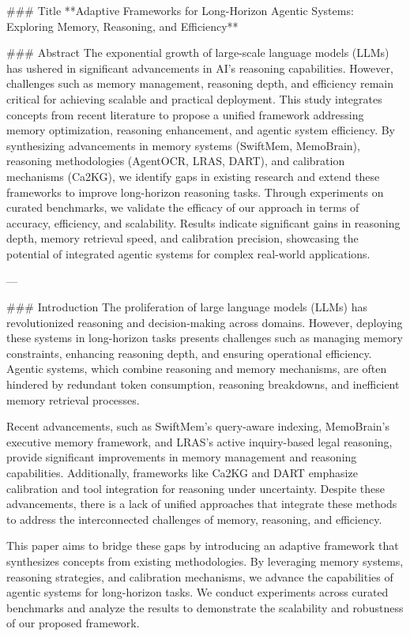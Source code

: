 ### Title
**Adaptive Frameworks for Long-Horizon Agentic Systems: Exploring Memory, Reasoning, and Efficiency**

### Abstract
The exponential growth of large-scale language models (LLMs) has ushered in significant advancements in AI's reasoning capabilities. However, challenges such as memory management, reasoning depth, and efficiency remain critical for achieving scalable and practical deployment. This study integrates concepts from recent literature to propose a unified framework addressing memory optimization, reasoning enhancement, and agentic system efficiency. By synthesizing advancements in memory systems (SwiftMem, MemoBrain), reasoning methodologies (AgentOCR, LRAS, DART), and calibration mechanisms (Ca2KG), we identify gaps in existing research and extend these frameworks to improve long-horizon reasoning tasks. Through experiments on curated benchmarks, we validate the efficacy of our approach in terms of accuracy, efficiency, and scalability. Results indicate significant gains in reasoning depth, memory retrieval speed, and calibration precision, showcasing the potential of integrated agentic systems for complex real-world applications.

---

### Introduction
The proliferation of large language models (LLMs) has revolutionized reasoning and decision-making across domains. However, deploying these systems in long-horizon tasks presents challenges such as managing memory constraints, enhancing reasoning depth, and ensuring operational efficiency. Agentic systems, which combine reasoning and memory mechanisms, are often hindered by redundant token consumption, reasoning breakdowns, and inefficient memory retrieval processes.

Recent advancements, such as SwiftMem's query-aware indexing, MemoBrain's executive memory framework, and LRAS's active inquiry-based legal reasoning, provide significant improvements in memory management and reasoning capabilities. Additionally, frameworks like Ca2KG and DART emphasize calibration and tool integration for reasoning under uncertainty. Despite these advancements, there is a lack of unified approaches that integrate these methods to address the interconnected challenges of memory, reasoning, and efficiency.

This paper aims to bridge these gaps by introducing an adaptive framework that synthesizes concepts from existing methodologies. By leveraging memory systems, reasoning strategies, and calibration mechanisms, we advance the capabilities of agentic systems for long-horizon tasks. We conduct experiments across curated benchmarks and analyze the results to demonstrate the scalability and robustness of our proposed framework.

